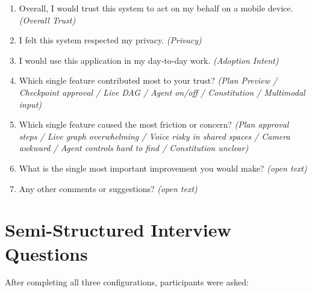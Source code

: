 \documentclass[sigconf, anonymous]{acmart}
\begin{document}
\begin{enumerate}
  \item Overall, I would trust this system to act on my behalf on a mobile device. \emph{(Overall Trust)}
  \item I felt this system respected my privacy. \emph{(Privacy)}
  \item I would use this application in my day-to-day work. \emph{(Adoption Intent)}
  \item[4.] Which single feature contributed most to your trust? \emph{(Plan Preview / Checkpoint approval / Live DAG / Agent on/off / Constitution / Multimodal input)}
  \item[5.] Which single feature caused the most friction or concern? \emph{(Plan approval steps / Live graph overwhelming / Voice risky in shared spaces / Camera awkward / Agent controls hard to find / Constitution unclear)}
  \item[--] What is the single most important improvement you would make? \emph{(open text)}
  \item[--] Any other comments or suggestions? \emph{(open text)}
\end{enumerate}

\section{Semi-Structured Interview Questions}
\label{app:interview}

After completing all three configurations, participants were asked:
\end{document}
